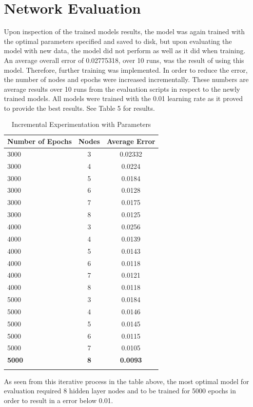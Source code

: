 \section*{Network Evaluation}
Upon inspection of the trained models results, the model was again trained with the optimal parameters specified and saved to disk, but upon evaluating the model with new data, the model did not perform as well as it did when training.
An average overall error of 0.02775318, over 10 runs, was the result of using this model. Therefore, further training was implemented. In order to reduce the error, the number of nodes and epochs were increased incrementally. These numbers are average results over 10 runs from the evaluation scripts in respect to the newly trained models. All models were trained with the 0.01 learning rate as it proved to provide the best results. See Table 5 for results.

 \begin{longtable}{|>{}p{4cm}|c|c|}
	\hline 
	Number of Epochs & Nodes & Average Error\\ 
	\hline 
	3000 & 3 & 0.02332\\ 
	\hline 
	3000 & 4 & 0.0224\\ 
	\hline 
	3000 & 5 & 0.0184\\ 
	\hline
	3000 & 6 & 0.0128\\ 
	\hline	
	3000 & 7 & 0.0175\\ 
	\hline
	3000 & 8 & 0.0125\\ 
	\hline 
	\hline
	4000 & 3 & 0.0256\\ 
	\hline	
	4000 & 4 & 0.0139\\ 
	\hline	
	4000 & 5 & 0.0143\\ 
	\hline	
 	4000 & 6 & 0.0118\\ 
	\hline	
 	4000 & 7 & 0.0121\\ 
	\hline
 	4000 & 8 & 0.0118\\ 
	\hline
	\hline
	5000 & 3 & 0.0184\\ 
	\hline	
	5000 & 4 & 0.0146\\ 
	\hline	
	5000 & 5 & 0.0145\\ 
	\hline	
	5000 & 6 & 0.0115\\ 
	\hline	
	5000 & 7 & 0.0105\\ 
	\hline
	\textbf{5000} &\textbf{8 }& \textbf{0.0093}\\
	\hline 
	\caption{Incremental Experimentation with Parameters}
\end{longtable}

As seen from this iterative process in the table above, the most optimal model for evaluation required 8 hidden layer nodes and to be trained for 5000 epochs in order to result in a error below 0.01.


